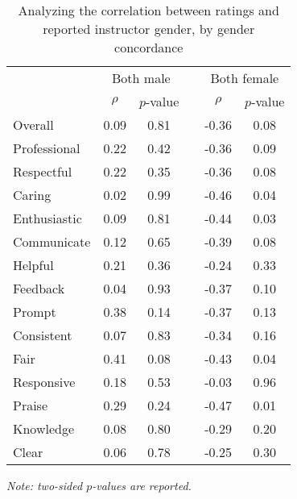 \documentclass[12pt]{article}
\begin{document}
\begin{table}[htbp]
  \centering
  \footnotesize 
  \caption{Analyzing the correlation between ratings and reported instructor gender, by gender concordance}
    \begin{tabular}{lccccc}
    \toprule 
          & \multicolumn{2}{c}{Both male}  &  & \multicolumn{2}{c}{Both female} \\
                          & $\rho$  &  $p$-value &  & $\rho$  & $p$-value    \\
                          
   \midrule
    Overall &                0.09       & 0.81 & & -0.36    & 0.08   \\
    Professional &           0.22       & 0.42 & & -0.36    & 0.09   \\
    Respectful			   & 0.22       & 0.35 & & -0.36    & 0.08   \\
    Caring &                 0.02       & 0.99 & & -0.46    & 0.04  \\
    Enthusiastic   &         0.09       & 0.81 & & -0.44    & 0.03   \\
    Communicate        &     0.12       & 0.65 & & -0.39    & 0.08  \\
    Helpful   &              0.21       & 0.36 & & -0.24    & 0.33   \\
    Feedback   &             0.04       & 0.93 & & -0.37    & 0.10   \\
    Prompt    &              0.38       & 0.14 & & -0.37    & 0.13   \\
    Consistent   &           0.07       & 0.83 & & -0.34    & 0.16   \\
    Fair   &                 0.41       & 0.08 & & -0.43    & 0.04  \\
    Responsive   &           0.18       & 0.53 & & -0.03    & 0.96  \\
    Praise    &              0.29       & 0.24 & & -0.47    & 0.01  \\
    Knowledge   &            0.08       & 0.80 & & -0.29    & 0.20  \\
    Clear   &                0.06       & 0.78 & & -0.25    & 0.30  \\
    \bottomrule
    \end{tabular}%
 \label{tab:macnell2}%

  \textit{Note: two-sided $p$-values are reported.}
\end{table}%
\normalsize
\end{document}
